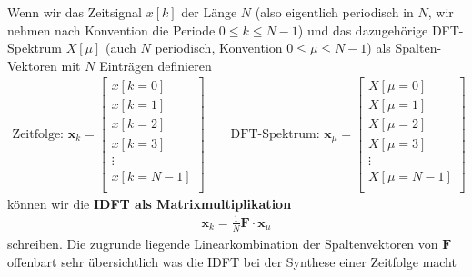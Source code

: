 Wenn wir das Zeitsignal $x[k]$ der Länge $N$ (also eigentlich periodisch in $N$,
wir nehmen nach Konvention die Periode $0 \leq k \leq N-1$)
und das dazugehörige DFT-Spektrum $X[\mu]$ (auch $N$ periodisch,
Konvention $0\leq \mu \leq N-1$)
als Spalten-Vektoren mit $N$ Einträgen definieren
\begin{align}
\text{Zeitfolge: }
\bm{x}_k =
\begin{bmatrix}
x[k=0]\\
x[k=1]\\
x[k=2]\\
x[k=3]\\
\vdots\\
x[k=N-1]\\
\end{bmatrix}\qquad
\text{DFT-Spektrum: }
\bm{x}_\mu =
\begin{bmatrix}
X[\mu=0]\\
X[\mu=1]\\
X[\mu=2]\\
X[\mu=3]\\
\vdots\\
X[\mu=N-1]\\
\end{bmatrix}
\end{align}
können wir die \textbf{IDFT als Matrixmultiplikation}
\begin{align}
\bm{x}_k = \frac{1}{N} \bm{F} \cdot \bm{x}_\mu
\end{align}
schreiben.
Die zugrunde liegende Linearkombination der Spaltenvektoren von $\bm{F}$
offenbart sehr übersichtlich was die IDFT bei der Synthese einer Zeitfolge macht
\label{LinComb_for_IDFT}
%
